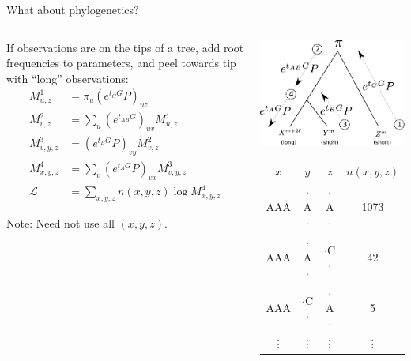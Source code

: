 \documentclass[smaller]{beamer}
\begin{document}
\begin{frame}{What about phylogenetics?}

  \begin{columns}[c]
    \begin{column}{.5\textwidth}

  If observations are on the tips of a tree, 
  add root frequencies to parameters,
  and peel towards tip with ``long'' observations:
  \begin{align*}
    M^1_{u,z} &= \pi_u \left( e^{t_C G} P \right)_{uz} \\
    M^2_{v,z} &= \sum_u \left( e^{t_{AB} G} \right)_{uv} M^1_{u,z} \\
    M^3_{v,y,z} &= \left( e^{t_B G} P \right)_{vy} M^2_{v,z} \\
    M^4_{x,y,z} &= \sum_v \left( e^{t_A G} P \right)_{vx} M^3_{v,y,z} \\
    \mathcal{L} &= \sum_{x,y,z} n(x,y,z) \log M^4_{x,y,z}
  \end{align*}

  \vspace{1em}

  {\newthing Note:} Need not use all $(x,y,z)$.

    \end{column}
    \begin{column}{.5\textwidth}

  \includegraphics[width=\textwidth]{../../peeling-schematic}

  \vspace{2em}

  \begin{center}
  \small
  \begin{tabular}{cccc}
    $x$ & $y$ & $z$ & $n(x,y,z)$ \\
    \hline
    AAA & $\cdot$A$\cdot$ & $\cdot$A$\cdot$ & 1073 \\
    AAA & $\cdot$A$\cdot$ & $\cdot$C$\cdot$ & 42 \\
    AAA & $\cdot$C$\cdot$ & $\cdot$A$\cdot$ & 5  \\
    \vdots & \vdots & \vdots & \vdots 
  \end{tabular}
  \end{center}


\end{column}
\end{columns}
\end{frame}
\end{document}
